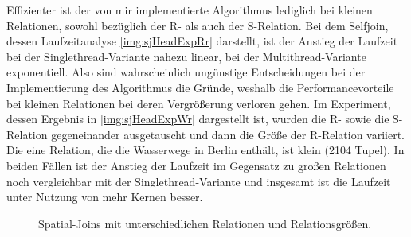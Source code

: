 \documentclass[a4paper,12pt,twoside]{article}
\begin{document}
Effizienter ist der von mir implementierte Algorithmus lediglich bei kleinen Relationen, sowohl bezüglich der R- als auch der S-Relation. Bei dem Selfjoin, dessen Laufzeitanalyse \autoref{img:sjHeadExpRr} darstellt, ist der Anstieg der Laufzeit bei der Singlethread-Variante nahezu linear, bei der Multithread-Variante exponentiell. Also sind wahrscheinlich ungünstige Entscheidungen bei der Implementierung des Algorithmus die Gründe, weshalb die Performancevorteile bei kleinen Relationen bei deren Vergrößerung verloren gehen. Im Experiment, dessen Ergebnis in \autoref{img:sjHeadExpWr} dargestellt ist, wurden die R- sowie die S-Relation gegeneinander ausgetauscht und dann die Größe der R-Relation variiert. Die eine Relation, die die Wasserwege in Berlin enthält, ist klein (2104 Tupel). In beiden Fällen ist der Anstieg der Laufzeit im Gegensatz zu großen Relationen noch vergleichbar mit der Singlethread-Variante und insgesamt ist die Laufzeit unter Nutzung von mehr Kernen besser. 

\begin{figure}[H]
	\centering
	\qquad	
	\caption{Spatial-Joins mit unterschiedlichen Relationen und Relationsgrößen.}
	\label{img:sjExpHeadAllg}
\end{figure}
\end{document}
